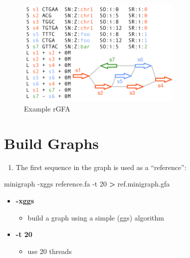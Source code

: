 \documentclass[
]{book}
\newenvironment{Shaded}{\begin{snugshade}}{\end{snugshade}}
\newcommand{\AttributeTok}[1]{\textcolor[rgb]{0.77,0.63,0.00}{#1}}
\newcommand{\ExtensionTok}[1]{#1}
\newcommand{\NormalTok}[1]{#1}
\newcommand{\OperatorTok}[1]{\textcolor[rgb]{0.81,0.36,0.00}{\textbf{#1}}}
\providecommand{\tightlist}{%
  \setlength{\itemsep}{0pt}\setlength{\parskip}{0pt}}
\begin{document}
\begin{figure}
\centering
\includegraphics[width=0.7\textwidth,height=\textheight]{./Figures/rGFA2.png}
\caption{Example rGFA}
\end{figure}

\hypertarget{build-graphs}{%
\section{Build Graphs}\label{build-graphs}}

\begin{enumerate}
\def\labelenumi{\arabic{enumi}.}
\tightlist
\item
  The first sequence in the graph is used as a ``reference'':
\end{enumerate}

\begin{Shaded}
\begin{Highlighting}[]
\ExtensionTok{minigraph} \AttributeTok{{-}xggs}\NormalTok{ reference.fa }\AttributeTok{{-}t}\NormalTok{ 20 }\OperatorTok{\textgreater{}}\NormalTok{ ref.minigraph.gfa}
\end{Highlighting}
\end{Shaded}

\begin{itemize}
\tightlist
\item
  \textbf{-xggs}

  \begin{itemize}
  \tightlist
  \item
    build a graph using a simple (ggs) algorithm
  \end{itemize}
\item
  \textbf{-t 20}

  \begin{itemize}
  \tightlist
  \item
    use 20 threads
  \end{itemize}
\end{itemize}
\end{document}
